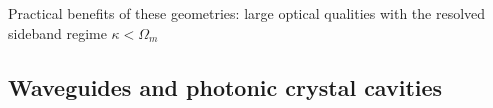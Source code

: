\documentclass[8pt,a4paper,twocolumn]{article} %
\numberwithin{equation}{section} %
\begin{document}
			Practical benefits of these geometries: large optical qualities with the resolved sideband regime $ \kappa<\Omega_m $



		\subsection{Waveguides and photonic crystal cavities} %
		\label{sub:waveguides_and}
		





	
\end{document}
